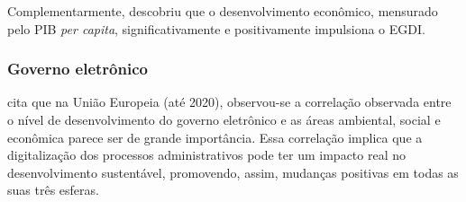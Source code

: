Complementarmente, \cite{kumar2020cultural} descobriu que o desenvolvimento econômico, mensurado pelo PIB \textit{per capita}, significativamente e positivamente impulsiona o EGDI. 

\subsubsection{Governo eletrônico}

\cite{ziolo2022government} cita que na União Europeia (até 2020), observou-se a correlação observada entre o nível de desenvolvimento do governo eletrônico e as áreas ambiental, social e econômica parece ser de grande importância. Essa correlação implica que a digitalização dos processos administrativos pode ter um impacto real no desenvolvimento sustentável, promovendo, assim, mudanças positivas em todas as suas três esferas.
